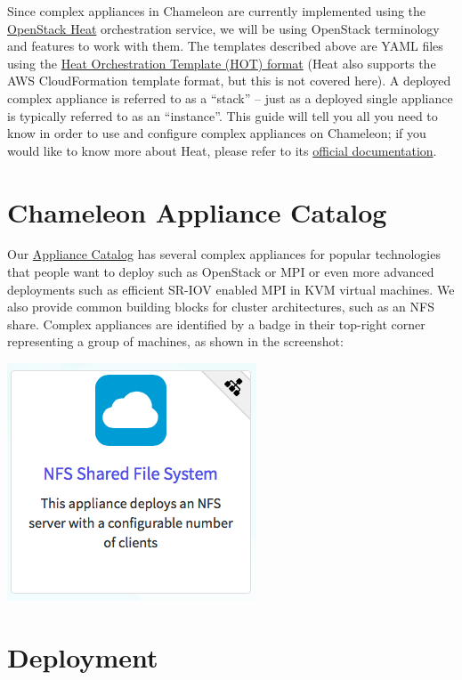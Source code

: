 Since complex appliances in Chameleon are currently implemented using
the \href{https://wiki.openstack.org/wiki/Heat}{OpenStack Heat}
orchestration service, we will be using OpenStack terminology and
features to work with them. The templates described above are YAML files
using the
\href{http://docs.openstack.org/developer/heat/template_guide/hot_spec.html}{Heat
Orchestration Template (HOT) format} (Heat also supports the AWS
CloudFormation template format, but this is not covered here). A
deployed complex appliance is referred to as a ``stack'' -- just as a
deployed single appliance is typically referred to as an ``instance''.
This guide will tell you all you need to know in order to use and
configure complex appliances on Chameleon; if you would like to know
more about Heat, please refer to its
\href{http://docs.openstack.org/developer/heat/}{official
documentation}.

\section{Chameleon Appliance Catalog}

Our \href{https://www.chameleoncloud.org/appliances/}{Appliance Catalog}
has several complex appliances for popular technologies that people want
to deploy such as OpenStack or MPI or even more advanced deployments
such as efficient SR-IOV enabled MPI in KVM virtual machines. We also
provide common building blocks for cluster architectures, such as an NFS
share. Complex appliances are identified by a badge in their top-right
corner representing a group of machines, as shown in the screenshot:

\includegraphics[width=0.5\columnwidth]{images/chameleon/NFS.png}

\section{Deployment}


